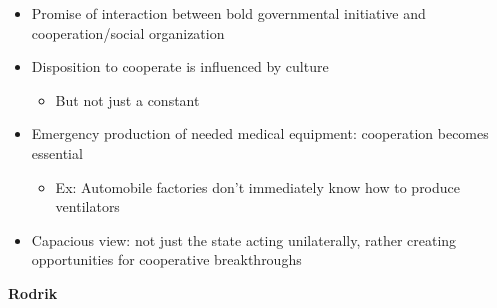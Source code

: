 \begin{itemize}
\tightlist
\item
  Promise of interaction between bold governmental initiative and
  cooperation/social organization
\item
  Disposition to cooperate is influenced by culture

  \begin{itemize}
  \tightlist
  \item
    But not just a constant
  \end{itemize}
\item
  Emergency production of needed medical equipment: cooperation becomes
  essential

  \begin{itemize}
  \tightlist
  \item
    Ex: Automobile factories don't immediately know how to produce
    ventilators
  \end{itemize}
\item
  Capacious view: not just the state acting unilaterally, rather
  creating opportunities for cooperative breakthroughs
\end{itemize}

\textbf{Rodrik}

